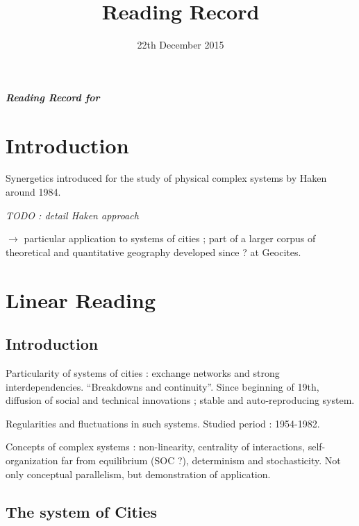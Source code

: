 


\title{Reading Record\bigskip\\
\cite{sanders1992systeme}
}
\author{}
\date{22th December 2015}


\maketitle

\textbf{\textit{Reading Record for \cite{sanders1992systeme}}}



\section{Introduction}

Synergetics introduced for the study of physical complex systems by Haken around 1984.

\textit{TODO : detail Haken approach}

$\rightarrow$ particular application to systems of cities ; part of a larger corpus of theoretical and quantitative geography developed since ? at Geocites.




\section{Linear Reading}

\subsection*{Introduction}

Particularity of systems of cities : exchange networks and strong interdependencies. ``Breakdowns and continuity''. Since beginning of 19th, diffusion of social and technical innovations ; stable and auto-reproducing system.

Regularities and fluctuations in such systems. Studied period : 1954-1982.

Concepts of complex systems : non-linearity, centrality of interactions, self-organization far from equilibrium (SOC ?), determinism and stochasticity. Not only conceptual parallelism, but demonstration of application.

\subsection{The system of Cities}

